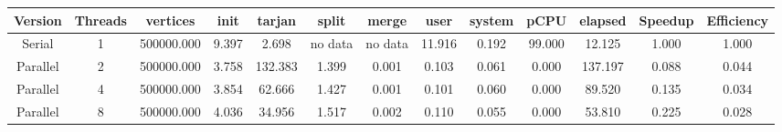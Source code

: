 \begin{tabular}{|c|c|c|c|c|c|c|c|c|c|c|c|c|}
\toprule
 Version &  Threads &   vertices &  init &  tarjan &   split &   merge &   user &  system &   pCPU &  elapsed &  Speedup &  Efficiency \\
\midrule
  Serial &        1 & 500000.000 & 9.397 &   2.698 & no data & no data & 11.916 &   0.192 & 99.000 &   12.125 &    1.000 &       1.000 \\
Parallel &        2 & 500000.000 & 3.758 & 132.383 &   1.399 &   0.001 &  0.103 &   0.061 &  0.000 &  137.197 &    0.088 &       0.044 \\
Parallel &        4 & 500000.000 & 3.854 &  62.666 &   1.427 &   0.001 &  0.101 &   0.060 &  0.000 &   89.520 &    0.135 &       0.034 \\
Parallel &        8 & 500000.000 & 4.036 &  34.956 &   1.517 &   0.002 &  0.110 &   0.055 &  0.000 &   53.810 &    0.225 &       0.028 \\
\bottomrule
\end{tabular}
